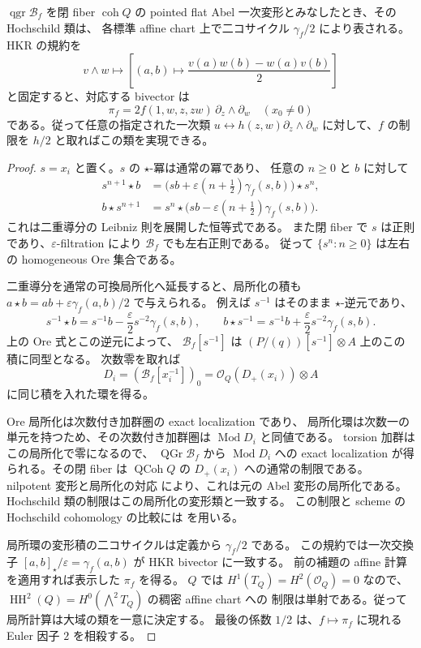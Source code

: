 \begin{proposition}
\label{prop:quadric-jacobian-abelian-class}
$\operatorname{qgr}\mathcal B_f$ を閉 fiber $\operatorname{coh}Q$ の
pointed flat Abel 一次変形とみなしたとき、その Hochschild 類は、
各標準 affine chart 上で二コサイクル $\gamma_f/2$ により表される。
HKR の規約を
\[
 v\wedge w\longmapsto
 \left[(a,b)\longmapsto
   \frac{v(a)w(b)-w(a)v(b)}2\right]
\]
と固定すると、対応する bivector は
\[
 \pi_f=2f(1,w,z,zw)\,\partial_z\wedge\partial_w
 \quad (x_0\ne0)
\]
である。従って任意の指定された一次類
$u\leftrightarrow h(z,w)\partial_z\wedge\partial_w$
に対して、$f$ の制限を $h/2$ と取ればこの類を実現できる。
\end{proposition}
\begin{proof}
$s=x_i$ と置く。$s$ の $\star$-冪は通常の冪であり、
任意の $n\ge0$ と $b$ に対して
\[
 \begin{aligned}
 s^{n+1}\star b
  &=\bigl(sb+\varepsilon(n+\tfrac12)\gamma_f(s,b)\bigr)\star s^n,\\
 b\star s^{n+1}
  &=s^n\star\bigl(sb-\varepsilon(n+\tfrac12)\gamma_f(s,b)\bigr).
 \end{aligned}
\]
これは二重導分の Leibniz 則を展開した恒等式である。
また閉 fiber で $s$ は正則であり、$\varepsilon$-filtration により
$\mathcal B_f$ でも左右正則である。
従って $\{s^n:n\ge0\}$ は左右の homogeneous Ore 集合である。

二重導分を通常の可換局所化へ延長すると、局所化の積も
$a\star b=ab+\varepsilon\gamma_f(a,b)/2$ で与えられる。
例えば $s^{-1}$ はそのまま $\star$-逆元であり、
\[
 s^{-1}\star b=s^{-1}b-\frac{\varepsilon}{2}s^{-2}\gamma_f(s,b),
 \qquad
 b\star s^{-1}=s^{-1}b+\frac{\varepsilon}{2}s^{-2}\gamma_f(s,b).
\]
上の Ore 式とこの逆元によって、
$\mathcal B_f[s^{-1}]$ は
$(P/(q))[s^{-1}]\otimes A$ 上のこの積に同型となる。
次数零を取れば
\[
 D_i=(\mathcal B_f[x_i^{-1}])_0
      =\mathcal O_Q(D_+(x_i))\otimes A
\]
に同じ積を入れた環を得る。

Ore 局所化は次数付き加群圏の exact localization であり、
局所化環は次数一の単元を持つため、その次数付き加群圏は
$\operatorname{Mod}D_i$ と同値である。
torsion 加群はこの局所化で零になるので、
$\operatorname{QGr}\mathcal B_f$ から $\operatorname{Mod}D_i$ への
exact localization が得られる。その閉 fiber は
$\operatorname{QCoh}Q$ の $D_+(x_i)$ への通常の制限である。
nilpotent 変形と局所化の対応
\cite[Theorem 7.1, Proposition 8.12]{LowenVanDenBergh2006}
により、これは元の Abel 変形の局所化である。
Hochschild 類の制限はこの局所化の変形類と一致する。
この制限と scheme の Hochschild cohomology の比較には
\cite[\S\S7.7--7.9, author preprint]{LowenVanDenBergh2005}
を用いる。

局所環の変形積の二コサイクルは定義から $\gamma_f/2$ である。
この規約では一次交換子 $[a,b]_\star/\varepsilon=\gamma_f(a,b)$ が
HKR bivector に一致する。
前の補題の affine 計算を適用すれば表示した $\pi_f$ を得る。
$Q$ では $H^1(T_Q)=H^2(\mathcal O_Q)=0$ なので、
$\operatorname{HH}^2(Q)=H^0(\bigwedge^2T_Q)$ の稠密 affine chart への
制限は単射である。従って局所計算は大域の類を一意に決定する。
最後の係数 $1/2$ は、$f\mapsto\pi_f$ に現れる Euler 因子 $2$ を相殺する。
\end{proof}

